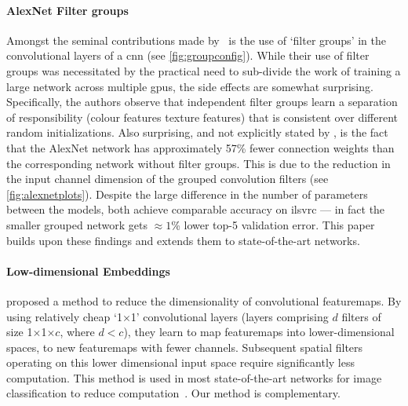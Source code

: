 \documentclass[thesis]{subfiles}
\begin{document}
	\paragraph{AlexNet Filter groups}\label{alexnetfiltergroups} Amongst the seminal contributions made by \citet{Krizhevsky2012}~is the use of `filter groups' in the convolutional layers of a \gls{cnn} (see \cref{fig:groupconfig}). While their use of filter groups was necessitated by the practical need to sub-divide the work of training a large network across multiple \gls{gpu}s, the side effects are somewhat surprising. Specifically, the authors observe that independent filter groups learn a separation of responsibility (colour features \vs{}texture features) that is consistent over different random initializations. Also surprising, and not explicitly stated by \citet{Krizhevsky2012}, is the fact that the AlexNet network has approximately 57\% fewer connection weights than the corresponding network without filter groups. This is due to the reduction in the input channel dimension of the grouped convolution filters (see \cref{fig:alexnetplots}).
	Despite the large difference in the number of parameters between the models, both achieve comparable accuracy on \gls{ilsvrc} --- in fact the smaller grouped network gets $\approx1$\% lower top-5 validation error. This paper builds upon these findings and extends them to state-of-the-art networks.
	
	\paragraph{Low-dimensional Embeddings}
	\citet{Lin2013NiN} proposed a method to reduce the dimensionality of convolutional \glspl{featuremap}. 
	By using relatively cheap `1$\times$1' convolutional layers (\ie layers comprising $d$ filters of size 1$\times$1$\times$$c$, where $d<c$), they learn to map \glspl{featuremap} into lower-dimensional spaces, \ie to new \glspl{featuremap} with fewer channels. Subsequent spatial filters operating on this lower dimensional input space require significantly less computation. This method is used in most state-of-the-art networks for image classification to reduce computation~\citep{Szegedy2014going,He2015}. Our method is complementary.
	
\end{document}
